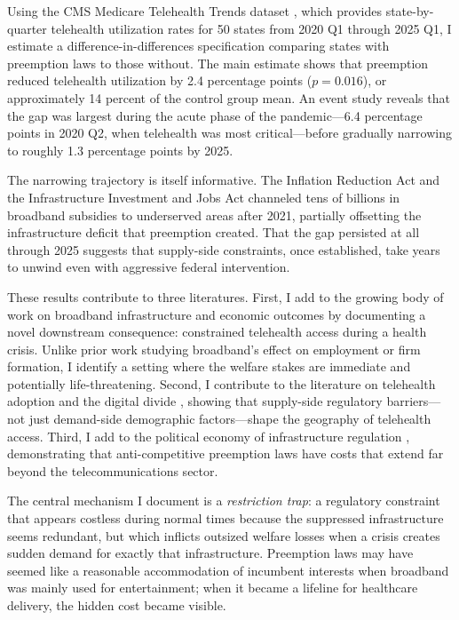 \documentclass[12pt]{article}
\begin{document}
Using the CMS Medicare Telehealth Trends dataset \citep{cms2024telehealth}, which provides state-by-quarter telehealth utilization rates for 50 states from 2020 Q1 through 2025 Q1, I estimate a difference-in-differences specification comparing states with preemption laws to those without. The main estimate shows that preemption reduced telehealth utilization by 2.4 percentage points ($p = 0.016$), or approximately 14 percent of the control group mean. An event study reveals that the gap was largest during the acute phase of the pandemic---6.4 percentage points in 2020 Q2, when telehealth was most critical---before gradually narrowing to roughly 1.3 percentage points by 2025.

The narrowing trajectory is itself informative. The Inflation Reduction Act and the Infrastructure Investment and Jobs Act channeled tens of billions in broadband subsidies to underserved areas after 2021, partially offsetting the infrastructure deficit that preemption created. That the gap persisted at all through 2025 suggests that supply-side constraints, once established, take years to unwind even with aggressive federal intervention.

These results contribute to three literatures. First, I add to the growing body of work on broadband infrastructure and economic outcomes \citep{kolko2012broadband, whitacre2014broadband, dettling2018broadband} by documenting a novel downstream consequence: constrained telehealth access during a health crisis. Unlike prior work studying broadband's effect on employment or firm formation, I identify a setting where the welfare stakes are immediate and potentially life-threatening. Second, I contribute to the literature on telehealth adoption and the digital divide \citep{mehrotra2017utilization, graves2023association, uscher2021telehealth}, showing that supply-side regulatory barriers---not just demand-side demographic factors---shape the geography of telehealth access. Third, I add to the political economy of infrastructure regulation \citep{gillett2006municipal, ford2019municipal}, demonstrating that anti-competitive preemption laws have costs that extend far beyond the telecommunications sector.

The central mechanism I document is a \textit{restriction trap}: a regulatory constraint that appears costless during normal times because the suppressed infrastructure seems redundant, but which inflicts outsized welfare losses when a crisis creates sudden demand for exactly that infrastructure. Preemption laws may have seemed like a reasonable accommodation of incumbent interests when broadband was mainly used for entertainment; when it became a lifeline for healthcare delivery, the hidden cost became visible.
\end{document}
